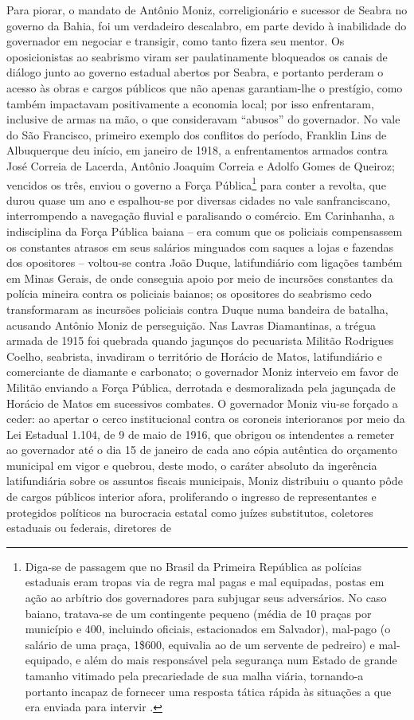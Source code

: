 Para piorar, o mandato de Antônio Moniz, correligionário e sucessor de Seabra no governo da Bahia, foi um verdadeiro descalabro, em parte devido à inabilidade do governador em negociar e transigir, como tanto fizera seu mentor. Os oposicionistas ao seabrismo viram ser paulatinamente bloqueados os canais de diálogo junto ao governo estadual abertos por Seabra, e portanto perderam o acesso às obras e cargos públicos que não apenas garantiam-lhe o prestígio, como também impactavam positivamente a economia local; por isso enfrentaram, inclusive de armas na mão, o que consideravam ``abusos'' do governador. No vale do São Francisco, primeiro exemplo dos conflitos do período, Franklin Lins de Albuquerque deu início, em janeiro de 1918, a enfrentamentos armados contra José Correia de Lacerda, Antônio Joaquim Correia e Adolfo Gomes de Queiroz; vencidos os três, enviou o governo a Força Pública\footnote{Diga-se de passagem que no Brasil da Primeira República as polícias estaduais eram tropas via de regra mal pagas e mal equipadas, postas em ação ao arbítrio dos governadores para subjugar seus adversários. No caso baiano, tratava-se de um contingente pequeno (média de 10 praças por município e 400, incluindo oficiais, estacionados em Salvador), mal-pago (o salário de uma praça, 1\$600, equivalia ao de um servente de pedreiro) e mal-equipado, e além do mais responsável pela segurança num Estado de grande tamanho vitimado pela precariedade de sua malha viária, tornando-a portanto incapaz de fornecer uma resposta tática rápida às situações a que era enviada para intervir \cite[pp.~46-47]{sampaio_legislativo_1985}.} para conter a revolta, que durou quase um ano e espalhou-se por diversas cidades no vale sanfranciscano, interrompendo a navegação fluvial e paralisando o comércio. Em Carinhanha, a indisciplina da Força Pública baiana -- era comum que os policiais compensassem os constantes atrasos em seus salários minguados com saques a lojas e fazendas dos opositores -- voltou-se contra João Duque, latifundiário com ligações também em Minas Gerais, de onde conseguia apoio por meio de incursões constantes da polícia mineira contra os policiais baianos; os opositores do seabrismo cedo transformaram as incursões policiais contra Duque numa bandeira de batalha, acusando Antônio Moniz de perseguição. Nas Lavras Diamantinas, a trégua armada de 1915 foi quebrada quando jagunços do pecuarista Militão Rodrigues Coelho, seabrista, invadiram o território de Horácio de Matos, latifundiário e comerciante de diamante e carbonato; o governador Moniz interveio em favor de Militão enviando a Força Pública, derrotada e desmoralizada pela jagunçada de Horácio de Matos em sucessivos combates. O governador Moniz viu-se forçado a ceder: ao apertar o cerco institucional contra os coroneis interioranos por meio da Lei Estadual 1.104, de 9 de maio de 1916, que obrigou os intendentes a remeter ao governador até o dia 15 de janeiro de cada ano cópia autêntica do orçamento municipal em vigor e quebrou, deste modo, o caráter absoluto da ingerência latifundiária sobre os assuntos fiscais municipais, Moniz distribuiu o quanto pôde de cargos públicos interior afora, proliferando o ingresso de representantes e protegidos políticos na burocracia estatal como juízes substitutos, coletores estaduais ou federais, diretores de 